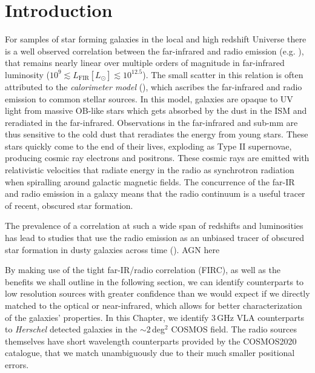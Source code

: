 \sloppy

\section{Introduction}

For samples of star forming galaxies in the local and high redshift Universe there is a well observed correlation between the far-infrared and radio emission (e.g. \citealt{Dickey_1984, deJong_1985, Helou_1985, Condon_1992, Barger_2000, Yun_2001, Garrett_2002, Appleton_2004, Ibar_2008, Seymour_2009, Sargent_2010}), that remains nearly linear over multiple orders of magnitude in far-infrared luminosity ($10^{9} \lesssim L_{\textrm{FIR}} [L_{\odot}] \lesssim 10^{12.5}$). The small scatter in this relation is often attributed to the \textit{calorimeter model} (\citealt{Voelk_1989, Lisenfeld_1996, Lacki_2010}), which ascribes the far-infrared and radio emission to common stellar sources. In this model, galaxies are opaque to UV light from massive OB-like stars which gets absorbed by the dust in the ISM and reradiated in the far-infrared. Observations in the far-infrared and sub-mm are thus sensitive to the cold dust that reradiates the energy from young stars. These stars quickly come to the end of their lives, exploding as Type II supernovae, producing cosmic ray electrons and positrons. These cosmic rays are emitted with relativistic velocities that radiate energy in the radio as synchrotron radiation when spiralling around galactic magnetic fields. The concurrence of the far-IR and radio emission in a galaxy means that the radio continuum is a useful tracer of recent, obscured star formation.

The prevalence of a correlation at such a wide span of redshifts and luminosities has lead to studies that use the radio emission as an unbiased tracer of obscured star formation in dusty galaxies across time (\citealt{Kennicutt_2012}). {\color{red}AGN here}

By making use of the tight far-IR/radio correlation (FIRC), as well as the benefits we shall outline in the following section, we can identify counterparts to low resolution sources with greater confidence than we would expect if we directly matched to the optical or near-infrared, which allows for better characterization of the galaxies' properties. In this Chapter, we identify $3\,$GHz VLA counterparts to \textit{Herschel} detected galaxies in the $\sim2\,$deg$^2$ COSMOS field. The radio sources themselves have short wavelength counterparts provided by the COSMOS2020 catalogue, that we match unambiguously due to their much smaller positional errors.

